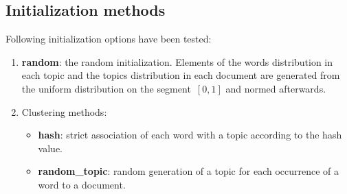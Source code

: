 \documentclass{sig-alternate-2013}
\begin{document}


\subsection{Initialization methods}

Following initialization options have been tested:
\begin{enumerate}
    \item \textbf{random}: the random initialization. Elements of the words distribution in each topic and the topics distribution in each document are generated from the uniform distribution on the segment~$[0, 1]$ and normed afterwards.
    \item Clustering methods:
        \begin{itemize}
            \item \textbf{hash}: strict association of each word with a topic according to the hash value.
            \item \textbf{random\_topic}: random generation of a topic for each occurrence of a word to a document.


\end{itemize}
\end{enumerate}
\end{document}
